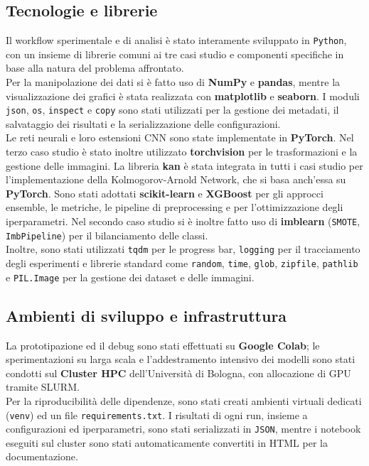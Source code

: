 \documentclass[a4paper,12pt]{report}
\begin{document}
	\subsection{Tecnologie e librerie}
	Il workflow sperimentale e di analisi è stato interamente sviluppato in \texttt{Python}, con un insieme di librerie comuni ai tre casi studio e componenti specifiche in base alla natura del problema affrontato. \\
	Per la manipolazione dei dati si è fatto uso di \textbf{NumPy} e \textbf{pandas}, mentre la visualizzazione dei grafici è stata realizzata con \textbf{matplotlib} e \textbf{seaborn}. I moduli \texttt{json}, \texttt{os}, \texttt{inspect} e \texttt{copy} sono stati utilizzati per la gestione dei metadati, il salvataggio dei risultati e la serializzazione delle configurazioni. \\
	Le reti neurali e loro estensioni CNN sono state implementate in \textbf{PyTorch}. Nel terzo caso studio è stato inoltre utilizzato \textbf{torchvision} per le trasformazioni e la gestione delle immagini. La libreria \textbf{kan} è stata integrata in tutti i casi studio per l’implementazione della Kolmogorov-Arnold Network, che si basa anch'essa su \textbf{PyTorch}.
	Sono stati adottati \textbf{scikit-learn} e \textbf{XGBoost} per gli approcci ensemble, le metriche, le pipeline di preprocessing e per l'ottimizzazione degli iperparametri. Nel secondo caso studio si è inoltre fatto uso di \textbf{imblearn} (\texttt{SMOTE}, \texttt{ImbPipeline}) per il bilanciamento delle classi. \\
	Inoltre, sono stati utilizzati \texttt{tqdm} per le progress bar, \texttt{logging} per il tracciamento degli esperimenti e librerie standard come \texttt{random}, \texttt{time}, \texttt{glob}, \texttt{zipfile}, \texttt{pathlib} e \texttt{PIL.Image} per la gestione dei dataset e delle immagini.
	
	\subsection{Ambienti di sviluppo e infrastruttura}
	La prototipazione ed il debug sono stati effettuati su \textbf{Google Colab}; le sperimentazioni su larga scala e l’addestramento intensivo dei modelli sono stati condotti sul \textbf{Cluster HPC} dell’Università di Bologna, con allocazione di GPU tramite SLURM. \\
	Per la riproducibilità delle dipendenze, sono stati creati ambienti virtuali dedicati (\texttt{venv}) ed un file \texttt{requirements.txt}. I risultati di ogni run, insieme a configurazioni ed iperparametri, sono stati serializzati in \texttt{JSON}, mentre i notebook eseguiti sul cluster sono stati automaticamente convertiti in HTML per la documentazione.
	
\end{document}
